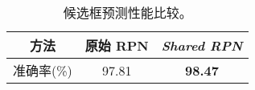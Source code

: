 \begin{table}[h]
	\centering
	\wuhao
	\caption{候选框预测性能比较。}
	\vspace{0.3cm}
	\begin{tabular}{ccc}
		\toprule[1.5pt]
		方法        & 原始 RPN & \textit{Shared RPN}  \\ \midrule
		准确率(\%)  & 97.81      & \textbf{98.47}       \\
		\bottomrule[1.5pt]
	\end{tabular}
	\label{table:rpn_result}
\end{table}
